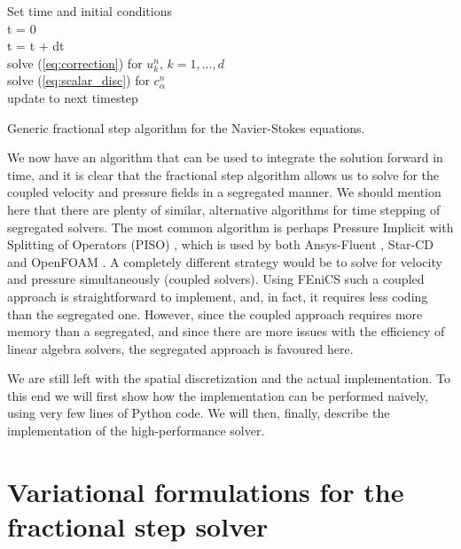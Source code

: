 \documentclass[final,3p,times,twocolumn]{elsarticle}
\begin{document}
\begin{algorithm}
Set time and initial conditions\\
t = 0\\
 {
  t = t + dt \\
  solve (\ref{eq:correction}) for ${u}_k^n, \,k=1,\ldots, d $\\
  solve (\ref{eq:scalar_disc}) for $c_{\alpha}^{n}$\\
  update to next timestep
}
\caption{Generic fractional step algorithm for the Navier-Stokes equations. }
\label{fig:fractionalstep}
\end{algorithm}

We now have an algorithm that can be used to integrate the solution forward in time, and it is clear that the fractional step algorithm allows us to solve for the coupled velocity and pressure fields in a segregated manner. We should mention here that there are plenty of similar, alternative algorithms for time stepping of segregated solvers. The most common algorithm is perhaps Pressure Implicit with Splitting of Operators (PISO) \cite{piso}, which is used by both Ansys-Fluent \cite{fluent}, Star-CD \cite{starcd} and OpenFOAM \cite{openfoam}. A completely different strategy would be to solve for velocity and pressure simultaneously (coupled solvers). Using FEniCS such a coupled approach is straightforward to implement, and, in fact, it requires less coding than the segregated one. However, since the coupled approach requires more memory than a segregated, and since there are more issues with the efficiency of linear algebra solvers, the segregated approach is favoured here. 

We are still left with the spatial discretization and the actual implementation. To this end we will first show how the implementation can be performed naively, using very few lines of Python code. We will then, finally, describe the implementation of the high-performance solver.

\section{Variational formulations for the fractional step solver}
\label{sec:variational}
\end{document}
